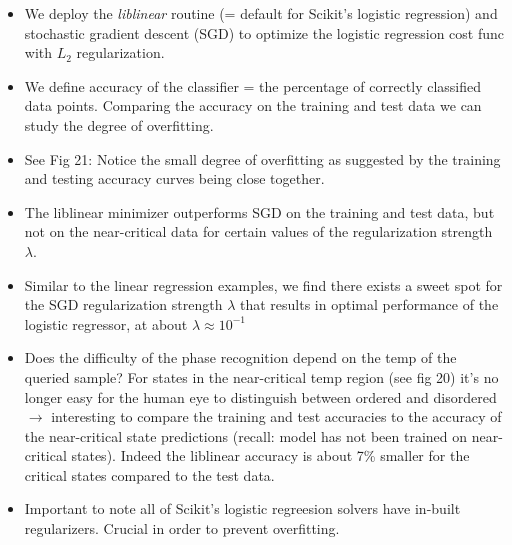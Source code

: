 \documentclass[norsk,a4paper,11pt]{article}
\begin{document}
\begin{itemize}
	\item We deploy the \textit{liblinear} routine (= default for Scikit's logistic regression) and stochastic gradient descent (SGD) to optimize the logistic regression cost func with $L_2$ regularization.
	\item We define accuracy of the classifier = the percentage of correctly classified data points. Comparing the accuracy on the training and test data we can study the degree of overfitting. 
	\item See Fig 21: Notice the small degree of overfitting as suggested by the training and testing accuracy curves being close together.
	\item The liblinear minimizer outperforms SGD on the training and test data, but not on the near-critical data for certain values of the regularization strength $\lambda$.
	\item Similar to the linear regression examples, we find there exists a sweet spot for the SGD regularization strength $\lambda$ that results in optimal performance of the logistic regressor, at about $\lambda \approx 10^{-1}$
	\item Does the difficulty of the phase recognition depend on the temp of the queried sample? For states in the near-critical temp region (see fig 20) it's no longer easy for the human eye to distinguish between ordered and disordered $\rightarrow$ interesting to compare the training and test accuracies to the accuracy of the near-critical state predictions (recall: model has not been trained on near-critical states). Indeed the liblinear accuracy is about 7\% smaller for the critical states compared to the test data.
	\item Important to note all of Scikit's logistic regreesion solvers have in-built regularizers. Crucial in order to prevent overfitting. 
\end{itemize}
\end{document}
